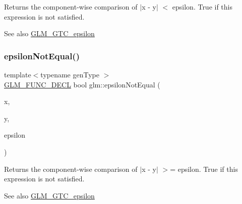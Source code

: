 Returns the component-\/wise comparison of $\vert$x -\/ y$\vert$ $<$ epsilon. True if this expression is not satisfied.

\begin{DoxySeeAlso}{See also}
\hyperlink{group__gtc__epsilon}{G\+L\+M\+\_\+\+G\+T\+C\+\_\+epsilon} 
\end{DoxySeeAlso}
\mbox{\label{group__gtc__epsilon_ga50a92103fb0cbd796908e1bf20c79aaf}} 
\subsubsection{\texorpdfstring{epsilon\+Not\+Equal()}{epsilonNotEqual()}\hspace{0.1cm}{\footnotesize\ttfamily [2/2]}}
{\footnotesize\ttfamily template$<$typename gen\+Type $>$ \\
\hyperlink{setup_8hpp_ab2d052de21a70539923e9bcbf6e83a51}{G\+L\+M\+\_\+\+F\+U\+N\+C\+\_\+\+D\+E\+CL} bool glm\+::epsilon\+Not\+Equal (\begin{DoxyParamCaption}\item[{gen\+Type const \&}]{x,  }\item[{gen\+Type const \&}]{y,  }\item[{gen\+Type const \&}]{epsilon }\end{DoxyParamCaption})}

Returns the component-\/wise comparison of $\vert$x -\/ y$\vert$ $>$= epsilon. True if this expression is not satisfied.

\begin{DoxySeeAlso}{See also}
\hyperlink{group__gtc__epsilon}{G\+L\+M\+\_\+\+G\+T\+C\+\_\+epsilon} 
\end{DoxySeeAlso}
